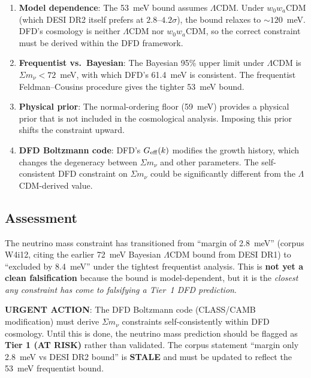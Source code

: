 \documentclass[11pt]{article}
\newcommand{\LCDM}{$\Lambda$CDM}
\newcommand{\Geff}{G_{\rm eff}}
\begin{document}
\begin{enumerate}[nosep]
\item \textbf{Model dependence}: The 53~meV bound assumes \LCDM.  Under
  $w_0 w_a$CDM (which DESI DR2 itself prefers at $2.8$--$4.2\sigma$),
  the bound relaxes to $\sim 120$~meV.  DFD's cosmology is neither
  \LCDM{} nor $w_0 w_a$CDM, so the correct constraint must be derived
  within the DFD framework.

\item \textbf{Frequentist vs.\ Bayesian}: The Bayesian 95\% upper
  limit under \LCDM{} is $\Sigma m_\nu < 72$~meV, with which DFD's
  61.4~meV is consistent.  The frequentist Feldman--Cousins procedure
  gives the tighter 53~meV bound.

\item \textbf{Physical prior}: The normal-ordering floor (59~meV)
  provides a physical prior that is not included in the cosmological
  analysis.  Imposing this prior shifts the constraint upward.

\item \textbf{DFD Boltzmann code}: DFD's $\Geff(k)$ modifies the
  growth history, which changes the degeneracy between $\Sigma m_\nu$
  and other parameters.  The self-consistent DFD constraint on
  $\Sigma m_\nu$ could be significantly different from the \LCDM-derived
  value.
\end{enumerate}

\subsection{Assessment}

The neutrino mass constraint has transitioned from ``margin of 2.8~meV''
(corpus W4i12, citing the earlier 72~meV Bayesian \LCDM{} bound from
DESI DR1) to ``excluded by 8.4~meV'' under the tightest frequentist
analysis.  This is \textbf{not yet a clean falsification} because the
bound is model-dependent, but it is the \emph{closest any constraint has
come to falsifying a Tier~1 DFD prediction}.

\begin{tcolorbox}[colback=red!10, colframe=red!70!black]
\textbf{URGENT ACTION}: The DFD Boltzmann code (CLASS/CAMB modification)
must derive $\Sigma m_\nu$ constraints self-consistently within DFD
cosmology.  Until this is done, the neutrino mass prediction should be
flagged as \textbf{Tier 1 (AT RISK)} rather than validated.  The corpus
statement ``margin only 2.8~meV vs DESI DR2 bound'' is \textbf{STALE}
and must be updated to reflect the 53~meV frequentist bound.
\end{tcolorbox}
\end{document}
